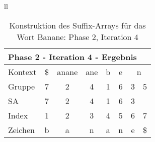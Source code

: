\begin{table}[H]
\begin{adjustbox}{max width=\textwidth}
\begin{tabular}{ll}
\begin{tabular}{lccccccc}
\multicolumn{8}{l}{Phase 2 - Iteration 4 - Ergebnis}                                                                                                                                     \\ \hline
\multicolumn{1}{l|}{Kontext} & \multicolumn{1}{c|}{\$} & \multicolumn{1}{c|}{anane} & \multicolumn{1}{c|}{ane} & \multicolumn{1}{c|}{b} & \multicolumn{1}{c|}{e} & \multicolumn{2}{c}{n} \\
\multicolumn{1}{l|}{Gruppe}  & \multicolumn{1}{c|}{7}  & \multicolumn{1}{c|}{2}     & \multicolumn{1}{c|}{4}   & \multicolumn{1}{c|}{1} & \multicolumn{1}{c|}{6} & 3         & 5          \\ 
\multicolumn{1}{l|}{SA}      & \multicolumn{1}{c|}{7}  & \multicolumn{1}{c|}{2}     & \multicolumn{1}{c|}{4}   & \multicolumn{1}{c|}{1} & \multicolumn{1}{c|}{6} & 3         &            \\ \hline
\multicolumn{1}{l|}{Index}   & 1                       & 2                          & 3                        & 4                      & 5                      & 6         & 7          \\
\multicolumn{1}{l|}{Zeichen} & b                       & a                          & n                        & a                      & n                      & e         & \$        
\end{tabular}

\end{tabular}
\end{adjustbox}

\caption[Konstruktion des Suffix-Arrays für das Wort Banane: Phase 2, Iteration 4]{Konstruktion des Suffix-Arrays für das Wort Banane: Phase 2, Iteration 4}
\label{fig_banane_2_4} 
\end{table}
